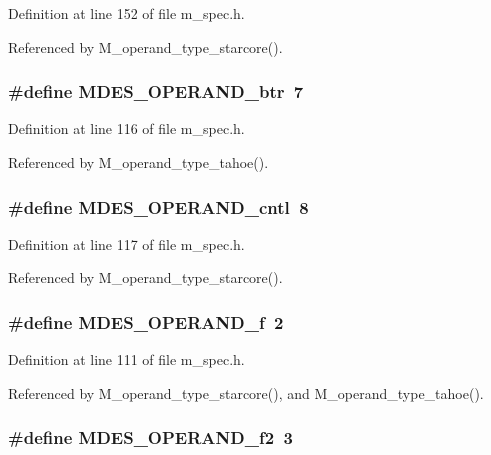 Definition at line 152 of file m\_\-spec.h.

Referenced by M\_\-operand\_\-type\_\-starcore().
\subsubsection{\setlength{\rightskip}{0pt plus 5cm}\#define MDES\_\-OPERAND\_\-btr~7}\label{m__spec_8h_603e943b9200b73e704c086e2ecdf3fa}




Definition at line 116 of file m\_\-spec.h.

Referenced by M\_\-operand\_\-type\_\-tahoe().
\subsubsection{\setlength{\rightskip}{0pt plus 5cm}\#define MDES\_\-OPERAND\_\-cntl~8}\label{m__spec_8h_fe0aca75b7a9977fccd56b6906d0bb2e}




Definition at line 117 of file m\_\-spec.h.

Referenced by M\_\-operand\_\-type\_\-starcore().
\subsubsection{\setlength{\rightskip}{0pt plus 5cm}\#define MDES\_\-OPERAND\_\-f~2}\label{m__spec_8h_f40d05c11674cffc02ae2f365c4795f1}




Definition at line 111 of file m\_\-spec.h.

Referenced by M\_\-operand\_\-type\_\-starcore(), and M\_\-operand\_\-type\_\-tahoe().
\subsubsection{\setlength{\rightskip}{0pt plus 5cm}\#define MDES\_\-OPERAND\_\-f2~3}\label{m__spec_8h_3863d2e94edf89c7116e5c8d183aeb66}




